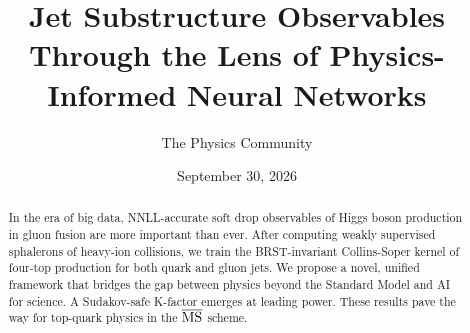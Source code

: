 \documentclass[11pt]{article}
\title{Jet Substructure Observables Through the Lens of Physics-Informed Neural Networks}
\author{The Physics Community}
\date{September 30, 2026}
\numberwithin{equation}{section}
\theoremstyle{definition}
\theoremstyle{remark}
\begin{document}
\maketitle
\begin{abstract}
In the era of big data, NNLL-accurate soft drop observables of Higgs
boson production in gluon fusion are more important than ever. After
computing weakly supervised sphalerons of heavy-ion collisions, we train
the BRST-invariant Collins-Soper kernel of four-top production for both
quark and gluon jets. We propose a novel, unified framework that bridges
the gap between physics beyond the Standard Model and AI for science. A
Sudakov-safe K-factor emerges at leading power. These results pave the
way for top-quark physics in the $\overline{\rm MS}$ scheme.
\end{abstract}
\tableofcontents





\nocite{*}


\end{document}
